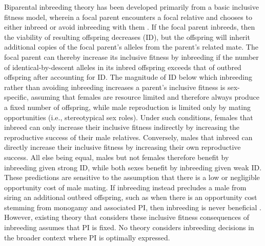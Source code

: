 \documentclass[10pt,letterpaper]{article}
\begin{document}
Biparental inbreeding theory has been developed primarily from a basic inclusive fitness model, wherein a focal parent encounters a focal relative and chooses to either inbreed or avoid inbreeding with them \cite[e.g.,][]{Parker1979, Parker2006, Kokko2006, Duthie2015a}. If the focal parent inbreeds, then the viability of resulting offspring decreases (ID), but the offspring will inherit additional copies of the focal parent's alleles from the parent's related mate. The focal parent can thereby increase its inclusive fitness by inbreeding if the number of identical-by-descent alleles in its inbred offspring exceeds that of outbred offspring after accounting for ID. The magnitude of ID below which inbreeding rather than avoiding inbreeding increases a parent's inclusive fitness is sex-specific, assuming that females are resource limited and therefore always produce a fixed number of offspring, while male reproduction is limited only by mating opportunities (i.e., stereotypical sex roles). Under such conditions, females that inbreed can only increase their inclusive fitness indirectly by increasing the reproductive success of their male relatives. Conversely, males that inbreed can directly increase their inclusive fitness by increasing their own reproductive success. All else being equal, males but not females therefore benefit by inbreeding given strong ID, while both sexes benefit by inbreeding given weak ID. These predictions are sensitive to the assumption that there is a low or negligible opportunity cost of male mating. If inbreeding instead precludes a male from siring an additional outbred offspring, such as when there is an opportunity cost stemming from monogamy and associated PI, then inbreeding is never beneficial \cite[][]{Waser1986}. However, existing theory that considers these inclusive fitness consequences of inbreeding assumes that PI is fixed. No theory considers inbreeding decisions in the broader context where PI is optimally expressed.
\end{document}
